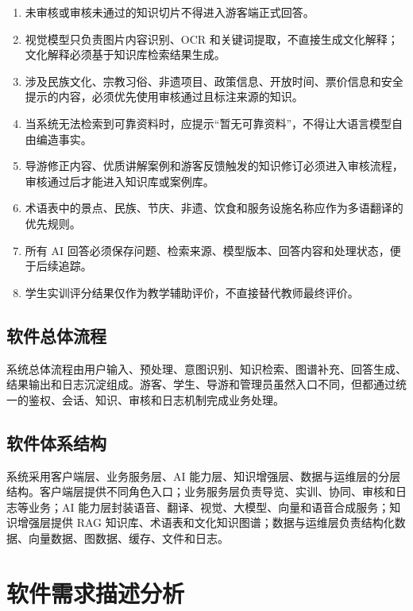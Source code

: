 \begin{enumerate}
  \item 未审核或审核未通过的知识切片不得进入游客端正式回答。
  \item 视觉模型只负责图片内容识别、OCR 和关键词提取，不直接生成文化解释；文化解释必须基于知识库检索结果生成。
  \item 涉及民族文化、宗教习俗、非遗项目、政策信息、开放时间、票价信息和安全提示的内容，必须优先使用审核通过且标注来源的知识。
  \item 当系统无法检索到可靠资料时，应提示“暂无可靠资料”，不得让大语言模型自由编造事实。
  \item 导游修正内容、优质讲解案例和游客反馈触发的知识修订必须进入审核流程，审核通过后才能进入知识库或案例库。
  \item 术语表中的景点、民族、节庆、非遗、饮食和服务设施名称应作为多语翻译的优先规则。
  \item 所有 AI 回答必须保存问题、检索来源、模型版本、回答内容和处理状态，便于后续追踪。
  \item 学生实训评分结果仅作为教学辅助评价，不直接替代教师最终评价。
\end{enumerate}

\subsection{软件总体流程}

系统总体流程由用户输入、预处理、意图识别、知识检索、图谱补充、回答生成、结果输出和日志沉淀组成。游客、学生、导游和管理员虽然入口不同，但都通过统一的鉴权、会话、知识、审核和日志机制完成业务处理。


\subsection{软件体系结构}

系统采用客户端层、业务服务层、AI 能力层、知识增强层、数据与运维层的分层结构。客户端层提供不同角色入口；业务服务层负责导览、实训、协同、审核和日志等业务；AI 能力层封装语音、翻译、视觉、大模型、向量和语音合成服务；知识增强层提供 RAG 知识库、术语表和文化知识图谱；数据与运维层负责结构化数据、向量数据、图数据、缓存、文件和日志。

\section{软件需求描述分析}

